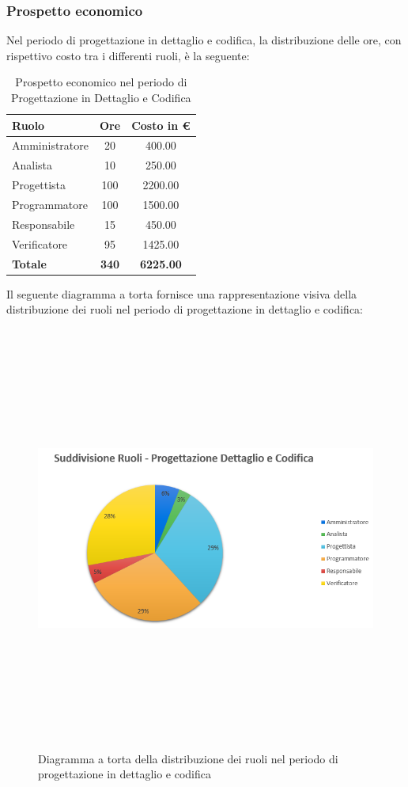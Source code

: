\subsubsection{Prospetto economico}
Nel periodo di progettazione in dettaglio e codifica, la distribuzione delle ore, con rispettivo costo tra i differenti ruoli, è la seguente:

\begin{table}[htbp]
\centering
\begin{tabular}{| l c c |}
\hline
\textbf{Ruolo} & \textbf{Ore} & \textbf{Costo in €}\\
\hline
Amministratore & 20 & 400.00\\
Analista & 10 & 250.00\\
Progettista & 100 & 2200.00 \\
Programmatore & 100 & 1500.00\\
Responsabile & 15 & 450.00\\
Verificatore & 95 & 1425.00\\
\hline
\textbf{Totale} & \textbf{340} & \textbf{6225.00}\\
\hline
\end{tabular}
\caption[Progettazione in dettaglio e codifica - Prospetto economico]{Prospetto economico nel periodo di Progettazione in Dettaglio e Codifica}
\end{table}
\newpage
Il seguente diagramma a torta fornisce una rappresentazione visiva della distribuzione dei ruoli nel periodo di progettazione in dettaglio e codifica:

\begin{figure}[htbp]
\centering
\includegraphics[width=14cm,height=14cm,keepaspectratio]{./img/ProspettoOrario/SRProgDettCod.png}
\caption[Progettazione dettaglio e codifica - Diagramma a torta suddivisione ruoli]{Diagramma a torta della distribuzione dei ruoli nel periodo di progettazione in dettaglio e codifica}
\end{figure}

